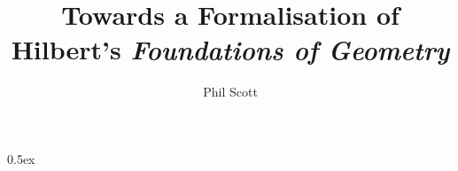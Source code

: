 \documentclass[phd,cisa]{infthesis}
\title{Towards a Formalisation of Hilbert's \emph{Foundations of Geometry}}
\author{Phil Scott}
\begin{document}
\begin{preliminary}

\maketitle


\standarddeclaration

\tableofcontents

\end{preliminary}

\parindent 0pt\parskip 0.5ex






















\appendix




\end{document}
